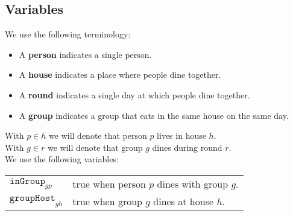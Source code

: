 \documentclass{scrartcl}
\begin{document}
\subsection{Variables} %
\label{sub:dinner_variables}
We use the following terminology:
\begin{itemize}
	\item A \textbf{person} indicates a single person.
	\item A \textbf{house} indicates a place where people dine together.
	\item A \textbf{round} indicates a single day at which people dine together.
	\item A \textbf{group} indicates a group that eats in the same house on the same day.
\end{itemize}
With $p\in h$ we will denote that person $p$ lives in house $h$.\\
With $g\in r$ we will denote that group $g$ dines during round $r$.\\

We use the following variables:\\
\begin{tabular}{ll}
	$\mathtt{inGroup}_{gp}$ & true when person $p$ dines with group $g$.\\
	$\mathtt{groupHost}_{gh}$ & true when group $g$ dines at house $h$.\\
\end{tabular}

\end{document}
